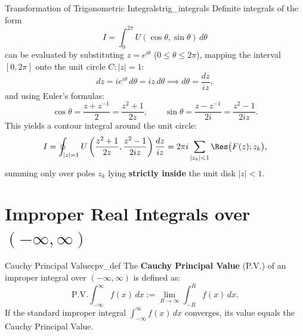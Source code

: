\begin{proposition}{Transformation of Trigonometric Integrals}{trig_integrals}
Definite integrals of the form
\begin{equation}
I = \int_0^{2\pi} U(\cos\theta, \sin\theta)\, d\theta
\end{equation}
can be evaluated by substituting $z = e^{i\theta}$ ($0 \le \theta \le 2\pi$), mapping the interval $[0, 2\pi]$ onto the unit circle $C: |z| = 1$:
\begin{equation}
dz = i e^{i\theta}\, d\theta = i z\, d\theta \implies d\theta = \frac{dz}{iz},
\end{equation}
and using Euler's formulas:
\begin{equation}
\cos\theta = \frac{z + z^{-1}}{2} = \frac{z^2 + 1}{2z}, \qquad \sin\theta = \frac{z - z^{-1}}{2i} = \frac{z^2 - 1}{2iz}.
\end{equation}
This yields a contour integral around the unit circle:
\begin{equation}
I = \oint_{|z|=1} U\left(\frac{z^2+1}{2z}, \frac{z^2-1}{2iz}\right) \frac{dz}{iz} = 2\pi i \sum_{|z_k| < 1} \Res\big(F(z); z_k\big),
\end{equation}
summing only over poles $z_k$ lying \textbf{strictly inside} the unit disk $|z| < 1$.
\end{proposition}


\section{Improper Real Integrals over \texorpdfstring{$(-\infty, \infty)$}{(-infinity, infinity)}}

\begin{definition}{Cauchy Principal Value}{cpv_def}
The \textbf{Cauchy Principal Value} (P.V.) of an improper integral over $(-\infty, \infty)$ is defined as:
\begin{equation}
\text{P.V.} \int_{-\infty}^\infty f(x)\, dx := \lim_{R \to \infty} \int_{-R}^R f(x)\, dx.
\end{equation}
If the standard improper integral $\int_{-\infty}^\infty f(x)\, dx$ converges, its value equals the Cauchy Principal Value.
\end{definition}

